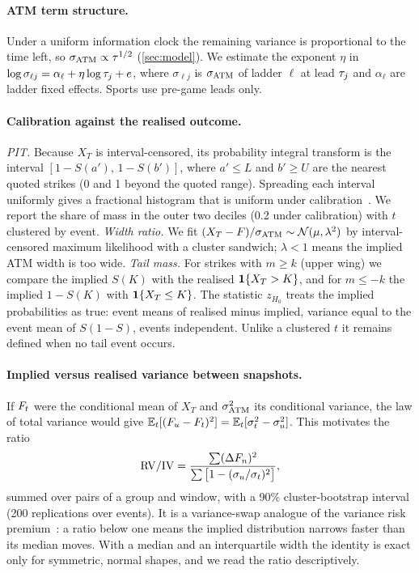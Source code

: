 \paragraph{ATM term structure.}
Under a uniform information clock the remaining variance is proportional to the time left, so
$\sigma_{\mathrm{ATM}}\propto\tau^{1/2}$ (\cref{sec:model}). We estimate the exponent $\eta$ in
$\log\sigma_{\ell j}=\alpha_\ell+\eta\log\tau_j+e$, where $\sigma_{\ell j}$ is $\sigma_{\mathrm{ATM}}$ of ladder
$\ell$ at lead $\tau_j$ and $\alpha_\ell$ are ladder fixed effects. Sports use pre-game leads only.

\paragraph{Calibration against the realised outcome.}
\emph{PIT.} Because $X_T$ is interval-censored, its probability integral transform is the interval
$[1-S(a'),\,1-S(b')]$, where $a'\le L$ and $b'\ge U$ are the nearest quoted strikes (0 and 1 beyond
the quoted range). Spreading each interval uniformly gives a fractional histogram that is uniform
under calibration~\citep{diebold1998,czado2009}. We report the share of mass in the outer two
deciles (0.2 under calibration) with $t$ clustered by event. \emph{Width ratio.} We fit
$(X_T-F)/\sigma_{\mathrm{ATM}}\sim\mathcal{N}(\mu,\lambda^2)$ by interval-censored maximum likelihood with a cluster
sandwich; $\lambda<1$ means the implied ATM width is too wide. \emph{Tail mass.} For strikes with
$m\ge k$ (upper wing) we compare the implied $S(K)$ with the realised $\mathbf{1}\{X_T>K\}$, and for
$m\le-k$ the implied $1-S(K)$ with $\mathbf{1}\{X_T\le K\}$. The statistic $z_{H_0}$ treats the implied
probabilities as true: event means of realised minus implied, variance equal to the event mean of
$S(1-S)$, events independent. Unlike a clustered $t$ it remains defined when no tail event occurs.

\paragraph{Implied versus realised variance between snapshots.}
If $F_t$ were the conditional mean of $X_T$ and $\sigma_{\mathrm{ATM}}^2$ its conditional variance, the law of
total variance would give $\mathbb{E}_t[(F_u-F_t)^2]=\mathbb{E}_t[\sigma_t^2-\sigma_u^2]$. This
motivates the ratio
\begin{equation}\label{eq:lad-vr}
  \mathrm{RV}/\mathrm{IV}=\frac{\sum(\Delta F_n)^2}{\sum\big[1-(\sigma_u/\sigma_t)^2\big]},
\end{equation}
summed over pairs of a group and window, with a 90\% cluster-bootstrap interval (200 replications
over events). It is a variance-swap analogue of the variance risk premium~\citep{carrwu2009,bollerslev2009}:
a ratio below one means the implied distribution narrows faster than its median moves. With a
median and an interquartile width the identity is exact only for symmetric, normal shapes, and we
read the ratio descriptively.


